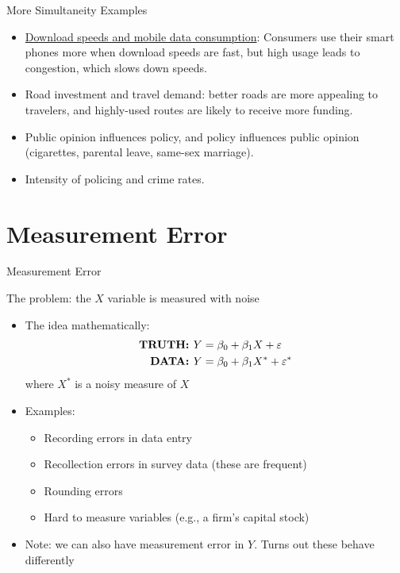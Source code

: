 \documentclass[aspectratio=169,11pt]{beamer}
\begin{document}
\begin{frame}{More Simultaneity Examples}
\begin{itemize}
	\item \href{https://www.ptscott.com/papers/telecom_infrastructure.pdf}{Download speeds and mobile data consumption}:
		Consumers use their smart phones more when download speeds are fast, but high usage leads to congestion, which slows
		down speeds.

	\bigskip
	\item Road investment and travel demand: better roads are more appealing to travelers, and highly-used routes are likely
		to receive more funding.

	\bigskip
	\item Public opinion influences policy, and policy influences public opinion (cigarettes, parental leave, same-sex marriage). 

	\bigskip
	\item Intensity of policing and crime rates. 
\end{itemize}
\end{frame}


\section{Measurement Error}


\begin{frame}{Measurement Error}

The problem: the $X$ variable is measured with noise

\begin{itemize}
	\item The idea mathematically:
		\begin{align*}
			\text{\bf{TRUTH}: } Y &= \beta_0 + \beta_1 X + \varepsilon \\
			\text{\bf{DATA}: }  Y &= \beta_0 + \beta_1 X^* + \varepsilon^*
		\end{align*}
		where $X^*$ is a noisy measure of $X$
	\item Examples: 
	\begin{itemize}
		\item Recording errors in data entry
		\item Recollection errors in survey data (these are frequent)
		\item Rounding errors
		\item Hard to measure variables (e.g., a firm's capital stock)
	\end{itemize}
	\item Note: we can also have measurement error in $Y$. Turns out these behave differently
\end{itemize}

	
\end{frame}
\end{document}
